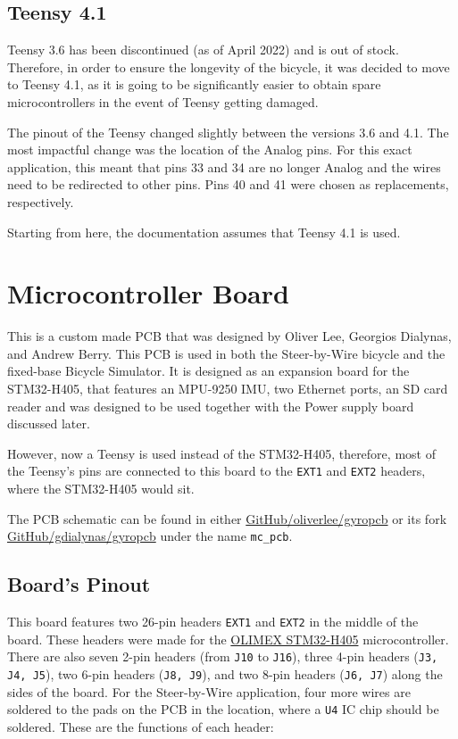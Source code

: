\subsection{Teensy 4.1}
Teensy 3.6 has been discontinued (as of April 2022) and is out of stock. Therefore, in order to ensure the longevity of the bicycle, it was decided to move to Teensy 4.1, as it is going to be significantly easier to obtain spare microcontrollers in the event of Teensy getting damaged.

The pinout of the Teensy changed slightly between the versions 3.6 and 4.1. The most impactful change was the location of the Analog pins. For this exact application, this meant that pins 33 and 34 are no longer Analog and the wires need to be redirected to other pins. Pins 40 and 41 were chosen as replacements, respectively.

Starting from here, the documentation assumes that Teensy 4.1 is used.

\section{Microcontroller Board}
This is a custom made PCB that was designed by Oliver Lee, Georgios Dialynas, and Andrew Berry. This PCB is used in both the Steer-by-Wire bicycle and the fixed-base Bicycle Simulator. It is designed as an expansion board for the STM32-H405, that features an MPU-9250 IMU, two Ethernet ports, an SD card reader and was designed to be used together with the Power supply board discussed later.

However, now a Teensy is used instead of the STM32-H405, therefore, most of the Teensy's pins are connected to this board to the \verb|EXT1| and \verb|EXT2| headers, where the STM32-H405 would sit.

The PCB schematic can be found in either \href{https://github.com/oliverlee/gyropcb}{GitHub/oliverlee/gyropcb} or its fork \href{https://github.com/gdialynas/gyropcb}{GitHub/gdialynas/gyropcb} under the name \verb|mc_pcb|.

\subsection{Board's Pinout}
This board features two 26-pin headers \verb|EXT1| and \verb|EXT2| in the middle of the board. These headers were made for the \href{https://www.olimex.com/Products/ARM/ST/STM32-H405/}{OLIMEX STM32-H405} microcontroller. There are also seven 2-pin headers (from \verb|J10| to \verb|J16|), three 4-pin headers (\verb|J3, J4, J5|), two 6-pin headers (\verb|J8, J9|), and two 8-pin headers (\verb|J6, J7|) along the sides of the board. For the Steer-by-Wire application, four more wires are soldered to the pads on the PCB in the location, where a \verb|U4| IC chip should be soldered. These are the functions of each header:

